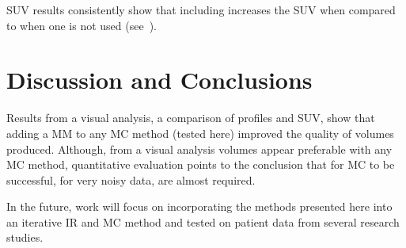     \gls{SUV} results consistently show that including  increases the \gls{SUV} when compared to when one is not used (see~).


\section{Discussion and Conclusions} \label{sec:discussion_and_conclusions}
    Results from a visual analysis, a comparison of profiles and \gls{SUV}, show that adding a \gls{MM} to any \gls{MC} method (tested here) improved the quality of volumes produced. Although, from a visual analysis volumes appear preferable with any \gls{MC} method, quantitative evaluation points to the conclusion that for \gls{MC} to be successful, for very noisy data,  are almost required.
    
    In the future, work will focus on incorporating the methods presented here into an iterative \acrlong{IR} and \gls{MC} method and tested on patient data from several research studies.%
    